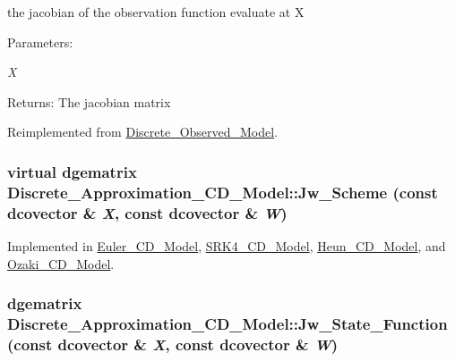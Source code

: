 the jacobian of the observation function evaluate at X 

\begin{Desc}
\item[Parameters:]
\begin{description}
\item[{\em X}]\end{description}
\end{Desc}
\begin{Desc}
\item[Returns:]The jacobian matrix \end{Desc}


Reimplemented from \hyperlink{class_discrete___observed___model_83cd1f2f54544d8977dbce844031f85e}{Discrete\_\-Observed\_\-Model}.\hypertarget{class_discrete___approximation___c_d___model_c7496999409a3f05125ceb7fe85e85ab}{
\subsubsection[{Jw\_\-Scheme}]{\setlength{\rightskip}{0pt plus 5cm}virtual dgematrix Discrete\_\-Approximation\_\-CD\_\-Model::Jw\_\-Scheme (const dcovector \& {\em X}, \/  const dcovector \& {\em W})}}
\label{class_discrete___approximation___c_d___model_c7496999409a3f05125ceb7fe85e85ab}




Implemented in \hyperlink{class_euler___c_d___model_d4b9cef601904d1e86c2f3a5f9e01b06}{Euler\_\-CD\_\-Model}, \hyperlink{class_s_r_k4___c_d___model_37045148c197b6143df008855179dfa3}{SRK4\_\-CD\_\-Model}, \hyperlink{class_heun___c_d___model_000fb9b8dbfb8171b8f330d7fc6d0dce}{Heun\_\-CD\_\-Model}, and \hyperlink{class_ozaki___c_d___model_66009069506580d175c869cea3df3cd6}{Ozaki\_\-CD\_\-Model}.\hypertarget{class_discrete___approximation___c_d___model_a5021c3ba6bd2cce5558a783843461ab}{
\subsubsection[{Jw\_\-State\_\-Function}]{\setlength{\rightskip}{0pt plus 5cm}dgematrix Discrete\_\-Approximation\_\-CD\_\-Model::Jw\_\-State\_\-Function (const dcovector \& {\em X}, \/  const dcovector \& {\em W})}}
\label{class_discrete___approximation___c_d___model_a5021c3ba6bd2cce5558a783843461ab}


